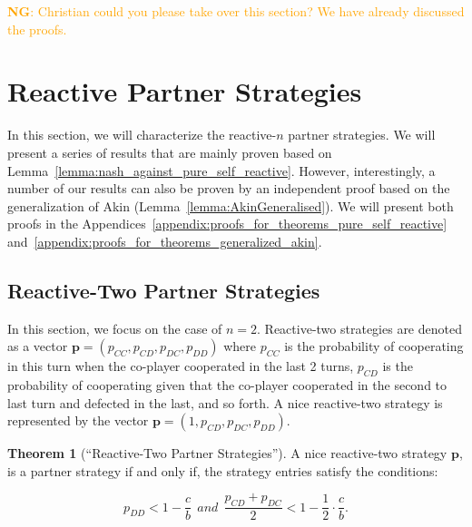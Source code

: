 \documentclass{article}
\newcommand{\nikoleta}[1]{\textcolor{orange}{\textbf{NG}: #1}}
\theoremstyle{definition}
\newtheorem{theorem}{Theorem}[section]
\begin{document}
\nikoleta{Christian could you please take over this section? We have already
discussed the proofs.}


\section{Reactive Partner Strategies}

In this section, we will characterize the reactive-$n$ partner strategies. We
will present a series of results that are mainly proven based on
Lemma~\ref{lemma:nash_against_pure_self_reactive}. However, interestingly, a
number of our results can also be proven by an independent proof based on the
generalization of Akin (Lemma~\ref{lemma:AkinGeneralised}). We will present both
proofs in the Appendices~\ref{appendix:proofs_for_theorems_pure_self_reactive}
and~\ref{appendix:proofs_for_theorems_generalized_akin}.


\subsection{Reactive-Two Partner Strategies}\label{section:reactive_two_partner_strategies}

In this section, we focus on the case of $n=2$. Reactive-two strategies are denoted as a vector
$\mathbf{p}=(p_{CC}, p_{CD}, p_{DC}, p_{DD})$ where $p_{CC}$ is the
probability of cooperating in this turn when the co-player cooperated in the
last 2 turns, $p_{CD}$ is the probability of cooperating given that the
co-player cooperated in the second to last turn and defected in the last, and so
forth. A nice reactive-two strategy is represented by the vector $\mathbf{p}=(1,
p_{CD}, p_{DC}, p_{DD})$.

\begin{theorem}[``Reactive-Two Partner Strategies'']\label{theorem:reactive_two_partner_strategies}
A nice reactive-two strategy $\mathbf{p}$, is a partner strategy if and only if,
the strategy entries satisfy the conditions:

\begin{equation}\label{eq:two_bit_conditions}
  \displaystyle p_{DD} < 1\!-\! \frac{c}{b}  ~~and~~ \displaystyle \frac{p_{CD} + p_{DC}}{2} < 1- \frac{1}{2} \cdot \frac{c}{b}.
\end{equation}
\end{theorem}
\end{document}

